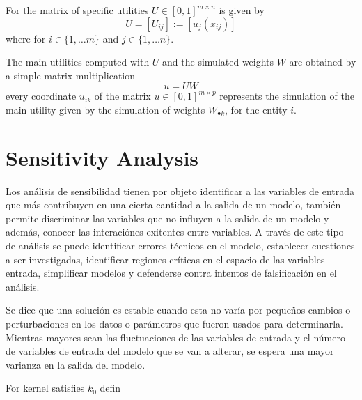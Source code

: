 For the matrix of specific utilities $U\in[0,1]^{m\times n}$ is given by
\begin{equation}
 U = [U_{ij}] := [u_j(x_{ij})]
\end{equation}
where for $i\in\{1,\ldots m\}$ and $j\in\{1,\ldots n\}$.

The main utilities computed with $U$ and the simulated weights $W$ are obtained by a simple 
matrix multiplication
\begin{equation}
u = U W
\end{equation}
every coordinate $u_{ik}$ of the matrix $u\in[0,1]^{m\times p}$ represents the simulation of the 
main utility given by the simulation of weights $W_{\bullet k}$, for the entity $i$. 

\section{Sensitivity Analysis}
Los análisis de sensibilidad tienen por objeto identificar a las variables de entrada que más 
contribuyen en una cierta cantidad a la salida de un modelo, también permite discriminar las
variables que no influyen a la salida de un modelo y además, conocer las interaciónes exitentes
entre variables\citep{4}. A través de este tipo de análisis se puede identificar errores técnicos en
el modelo, establecer cuestiones a ser investigadas, identificar regiones críticas en el espacio de
las variables entrada, simplificar modelos y defenderse contra intentos de falsificación en el
análisis\citep{5}. 

Se dice que una solución es estable cuando esta no varía por pequeños cambios o perturbaciones en 
los datos o parámetros que fueron usados para determinarla\citep{2}. Mientras mayores sean las
fluctuaciones de las variables de entrada y el número de variables de entrada del modelo que se van
a alterar, se espera una mayor varianza en la salida del modelo\citep{5}. 

\begin{proposition}
For kernel satisfies $k_0$ defin
 
\end{proposition}

